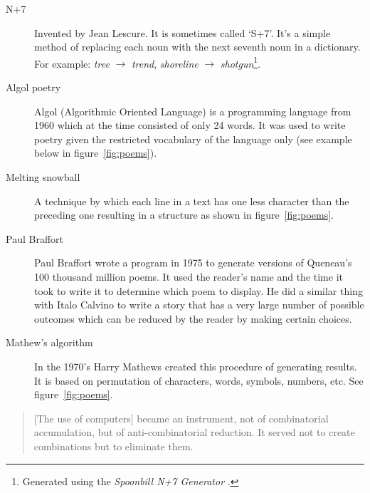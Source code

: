 \begin{description}
  \item[N+7] Invented by Jean Lescure. It is sometimes called `S+7'. It's a simple method of replacing each noun with the next seventh noun in a dictionary. For example: \textit{tree} $\rightarrow$ \textit{trend}, \textit{shoreline} $\rightarrow$ \textit{shotgun}\footnote{Generated using the \textit{Spoonbill N+7 Generator} \autocite{Spoonmaster2016}.}.
  \item[Algol poetry] Algol (Algorithmic Oriented Language) is a programming language from 1960 which at the time consisted of only 24 words. It was used to write poetry given the restricted vocabulary of the language only (see example below in figure~\ref{fig:poems}).
  \item[Melting snowball] A technique by which each line in a text has one less character than the preceding one resulting in a structure as shown in figure~\ref{fig:poems}.
  \item[Paul Braffort] Paul Braffort wrote a program in 1975 to generate versions of Queneau's \num{100} thousand million poems. It used the reader's name and the time it took to write it to determine which poem to display. He did a similar thing with Italo Calvino to write a story that has a very large number of possible outcomes which can be reduced by the reader by making certain choices.
  \item[Mathew's algorithm] In the 1970's Harry Mathews created this procedure of generating results. It is based on permutation of characters, words, symbols, numbers, etc. See figure~\ref{fig:poems}.
\end{description}

\begin{quotation}
  [The use of computers] became an instrument, not of combinatorial accumulation, but of anti-combinatorial reduction. It served not to create combinations but to eliminate them.
\end{quotation}

